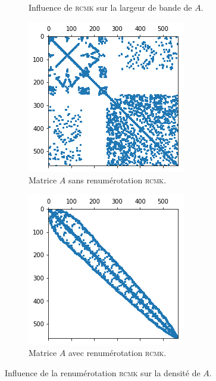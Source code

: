 \documentclass[11pt]{article}
\begin{document}
\begin{figure}[H]
\begin{subfigure}[t]{0.27\textwidth}
		\caption{Influence de \textsc{rcmk} sur la largeur de bande de $A$.}
		\label{fig:bandwidth}
	\end{subfigure}\hfill
	\begin{subfigure}[t]{0.2\textwidth}
		\centering
		\includegraphics[width=\linewidth]{spy.png}
		\caption{Matrice $A$ sans renumérotation \textsc{rcmk}.}
		\label{fig:spy}
	\end{subfigure}\hfill
	\begin{subfigure}[t]{0.2\textwidth}
		\centering
		\includegraphics[width=\linewidth]{spy_rcmk.png}
		\caption{Matrice $A$ avec renumérotation \textsc{rcmk}.}
		\label{fig:spy_rcmk}
	\end{subfigure}
	\caption{Influence de la renumérotation \textsc{rcmk} sur la densité de $A$.}
	\label{fig:rcmk}
\end{figure}
\end{document}
